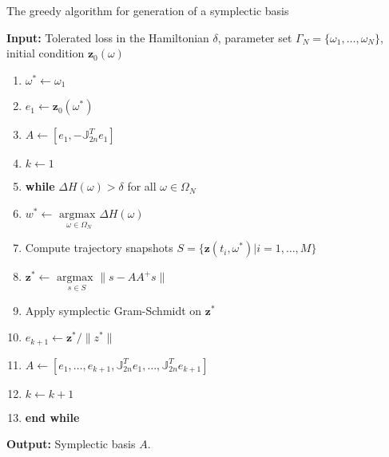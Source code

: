 \begin{algorithm} 
\caption{The greedy algorithm for generation of a symplectic basis} \label{alg:SyMo:3}
{\bf Input:} Tolerated loss in the Hamiltonian $\delta$, parameter set $\Gamma_N = \{\omega_1,\dots,\omega_N\}$, initial condition $\mathbf z_0(\omega)$
\begin{enumerate}
\item $\omega^* \leftarrow \omega_1$
\item $e_1 \leftarrow \mathbf z_0(\omega^*)$
\item $A \leftarrow [e_1,-\mathbb J^T_{2n}e_1]$
\item $k \leftarrow 1$
\item \textbf{while} $\Delta H(\omega) > \delta$ for all $\omega \in \Omega_N$
\item \hspace{0.5cm} $w^* \leftarrow$ $\underset{\omega\in \Omega_N}{\text{argmax }}\Delta H(\omega)$
\item \hspace{0.5cm} Compute trajectory snapshots $S=\{ \mathbf z(t_i,\omega^*) | i = 1,\dots,M \}$
\item \hspace{0.5cm} $\mathbf z^* \leftarrow$ $\underset{s\in S}{\text{argmax }} \| s - AA^+s \|$
\item \hspace{0.5cm} Apply symplectic Gram-Schmidt on $\mathbf z^*$
\item \hspace{0.5cm} $e_{k+1} \leftarrow \mathbf z^*/ \| z^*\|$
\item \hspace{0.5cm} $A \leftarrow [e_1,\dots ,e_{k+1} , \mathbb J^T_{2n}e_1,\dots,\mathbb J^T_{2n}e_{k+1}]$
\item \hspace{0.5cm} $k \leftarrow k+1$
\item \textbf{end while}
\end{enumerate}
\vspace{0.5cm}
{\bf Output:} Symplectic basis $A$.
\end{algorithm}


